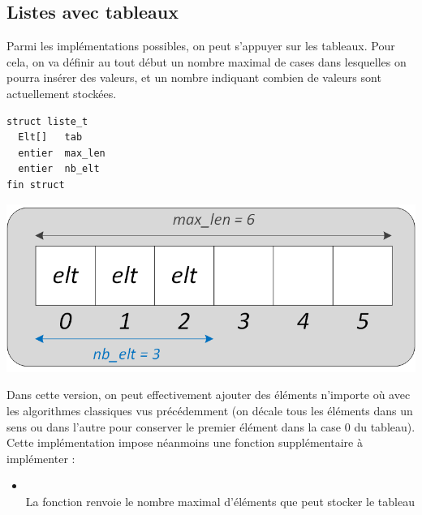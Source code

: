 \documentclass[11pt,a4paper]{article}
\begin{document}
\bigskip


\subsection{Listes avec tableaux}

\bigskip

Parmi les implémentations possibles, on peut s'appuyer sur les tableaux.
Pour cela, on va définir au tout début un nombre maximal de cases dans lesquelles on pourra insérer des valeurs, et un nombre indiquant combien de valeurs sont actuellement stockées.

\begin{table}[!ht]
  \centering
  \begin{minipage}{0.4\textwidth}
    \centering
\begin{lstlisting}[style=algorithmique]
struct liste_t
  Elt[]   tab
  entier  max_len
  entier  nb_elt
fin struct \end{lstlisting}
  \end{minipage}
  \hfillx
  \begin{minipage}{0.55\textwidth}
    \centering
\includegraphics[scale=0.75]{img/listes/Listes_Tableau_1_Structure_Detaillee.png}
  \end{minipage}
\end{table}

Dans cette version, on peut effectivement ajouter des éléments n'importe où avec les algorithmes classiques vus précédemment (on décale tous les éléments dans un sens ou dans l'autre pour conserver le premier élément dans la case $ 0 $ du tableau).
Cette implémentation impose néanmoins une fonction supplémentaire à implémenter :

\begin{itemize}
\item {}\\
      La fonction renvoie le nombre maximal d'éléments que peut stocker le tableau
\end{itemize}
\end{document}
